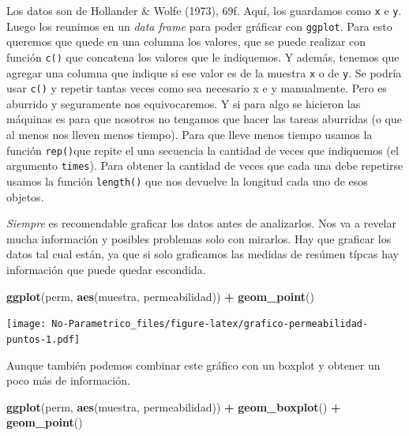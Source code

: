 \documentclass[]{book}
\newenvironment{Shaded}{\begin{snugshade}}{\end{snugshade}}
\newcommand{\KeywordTok}[1]{\textcolor[rgb]{0.13,0.29,0.53}{\textbf{#1}}}
\newcommand{\NormalTok}[1]{#1}
\newcommand{\OperatorTok}[1]{\textcolor[rgb]{0.81,0.36,0.00}{\textbf{#1}}}
\newcommand{\StringTok}[1]{\textcolor[rgb]{0.31,0.60,0.02}{#1}}
\theoremstyle{definition}
\theoremstyle{definition}
\theoremstyle{definition}
\theoremstyle{remark}
\begin{document}
Los datos son de Hollander \& Wolfe (1973), 69f. Aquí, los guardamos
como \texttt{x} e \texttt{y}. Luego los reunimos en un \emph{data frame}
para poder gráficar con \texttt{ggplot}. Para esto queremos que quede en
una columna los valores, que se puede realizar con función \texttt{c()}
que concatena los valores que le indiquemos. Y además, tenemos que
agregar una columna que indique si ese valor es de la muestra \texttt{x}
o de \texttt{y}. Se podría usar \texttt{c()} y repetir tantas veces como
sea necesario x e y manualmente. Pero es aburrido y seguramente nos
equivocaremos. Y si para algo se hicieron las máquinas es para que
nosotros no tengamos que hacer las tareas aburridas (o que al menos nos
lleven menos tiempo). Para que lleve menos tiempo usamos la función
\texttt{rep()}que repite el una secuencia la cantidad de veces que
indiquemos (el argumento \texttt{times}). Para obtener la cantidad de
veces que cada una debe repetirse usamos la función \texttt{length()}
que nos devuelve la longitud cada uno de esos objetos.

\emph{Siempre} es recomendable graficar los datos antes de analizarlos.
Nos va a revelar mucha información y posibles problemas solo con
mirarlos. Hay que graficar los datos tal cual están, ya que si solo
graficamos las medidas de resúmen típcas hay información que puede
quedar escondida.

\begin{Shaded}
\begin{Highlighting}[]
\KeywordTok{ggplot}\NormalTok{(perm, }\KeywordTok{aes}\NormalTok{(muestra, permeabilidad)) }\OperatorTok{+}
\StringTok{  }\KeywordTok{geom_point}\NormalTok{()}
\end{Highlighting}
\end{Shaded}

\texttt{[image: No-Parametrico\_files/figure-latex/grafico-permeabilidad-puntos-1.pdf]}

Aunque también podemos combinar este gráfico con un boxplot y obtener un
poco más de información.

\begin{Shaded}
\begin{Highlighting}[]
\KeywordTok{ggplot}\NormalTok{(perm, }\KeywordTok{aes}\NormalTok{(muestra, permeabilidad)) }\OperatorTok{+}
\StringTok{  }\KeywordTok{geom_boxplot}\NormalTok{() }\OperatorTok{+}
\StringTok{  }\KeywordTok{geom_point}\NormalTok{()}
\end{Highlighting}
\end{Shaded}
\end{document}
